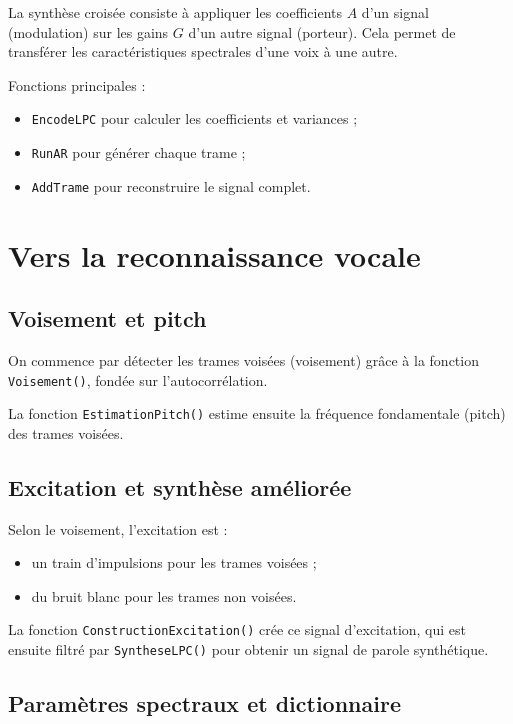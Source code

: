 \documentclass[11pt]{article}
\begin{document}
La synthèse croisée consiste à appliquer les coefficients \( A \) d’un signal (modulation) sur les gains \( G \) d’un autre signal (porteur). Cela permet de transférer les caractéristiques spectrales d’une voix à une autre.

Fonctions principales :
\begin{itemize}
    \item \texttt{EncodeLPC} pour calculer les coefficients et variances ;
    \item \texttt{RunAR} pour générer chaque trame ;
    \item \texttt{AddTrame} pour reconstruire le signal complet.
\end{itemize}

\section{Vers la reconnaissance vocale}

\subsection{Voisement et pitch}

On commence par détecter les trames voisées (voisement) grâce à la fonction \texttt{Voisement()}, fondée sur l’autocorrélation.

La fonction \texttt{EstimationPitch()} estime ensuite la fréquence fondamentale (pitch) des trames voisées.

\subsection{Excitation et synthèse améliorée}

Selon le voisement, l’excitation est :
\begin{itemize}
    \item un train d’impulsions pour les trames voisées ;
    \item du bruit blanc pour les trames non voisées.
\end{itemize}

La fonction \texttt{ConstructionExcitation()} crée ce signal d’excitation, qui est ensuite filtré par \texttt{SyntheseLPC()} pour obtenir un signal de parole synthétique.

\subsection{Paramètres spectraux et dictionnaire}
\end{document}

